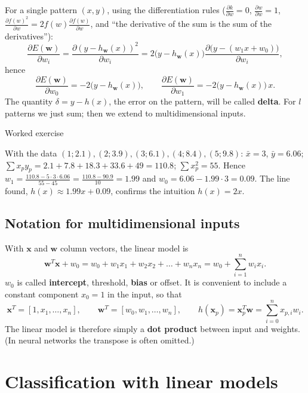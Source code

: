 For a single pattern \((x, y)\), using the differentiation rules
(\(\frac{\partial k}{\partial w} = 0\),
\(\frac{\partial w}{\partial w} = 1\),
\(\frac{\partial f(w)^2}{\partial w} = 2 f(w) \frac{\partial f(w)}{\partial w}\),
and ``the derivative of the sum is the sum of the derivatives''): \[
\frac{\partial E(\mathbf{w})}{\partial w_i} = \frac{\partial (y - h_\mathbf{w}(x))^2}{\partial w_i} = 2\big(y - h_\mathbf{w}(x)\big) \frac{\partial \big(y - (w_1 x + w_0)\big)}{\partial w_i},
\] hence \[
\frac{\partial E(\mathbf{w})}{\partial w_0} = -2\big(y - h_\mathbf{w}(x)\big), \qquad \frac{\partial E(\mathbf{w})}{\partial w_1} = -2\big(y - h_\mathbf{w}(x)\big)\, x.
\] The quantity \(\delta = y - h(x)\), the error on the pattern, will
be called \textbf{delta}. For \(l\) patterns we just sum; then we
extend to multidimensional inputs.

\begin{boxexample}{Worked exercise}

With the data \((1;2.1), (2;3.9), (3;6.1), (4;8.4), (5;9.8)\):
\(\bar x = 3\), \(\bar y = 6.06\);
\(\sum x_p y_p = 2.1 + 7.8 + 18.3 + 33.6 + 49 = 110.8\);
\(\sum x_p^2 = 55\). Hence
\(w_1 = \frac{110.8 - 5 \cdot 3 \cdot 6.06}{55 - 45} = \frac{110.8 - 90.9}{10} = 1.99\)
and \(w_0 = 6.06 - 1.99 \cdot 3 = 0.09\). The line found,
\(h(x) \approx 1.99x + 0.09\), confirms the intuition \(h(x) = 2x\).

\end{boxexample}

\subsection{Notation for multidimensional
inputs}\label{notazione-per-input-multidimensionali}

With \(\mathbf{x}\) and \(\mathbf{w}\) column vectors, the linear model
is \[
\mathbf{w}^T\mathbf{x} + w_0 = w_0 + w_1 x_1 + w_2 x_2 + \dots + w_n x_n = w_0 + \sum_{i=1}^{n} w_i x_i.
\] \(w_0\) is called \textbf{intercept}, threshold, \textbf{bias} or
offset. It is convenient to include a constant component \(x_0 = 1\)
in the input, so that \[
\mathbf{x}^T = [1, x_1, \dots, x_n], \qquad \mathbf{w}^T = [w_0, w_1, \dots, w_n], \qquad h(\mathbf{x}_p) = \mathbf{x}_p^T\mathbf{w} = \sum_{i=0}^{n} x_{p,i} w_i.
\] The linear model is therefore simply a \textbf{dot product} between
input and weights. (In neural networks the transpose is often
omitted.)

\section{Classification with linear
models}\label{classificazione-con-modelli-lineari}

